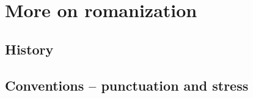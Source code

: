 







\section{More on romanization}
\subsection{History}
\subsection{Conventions -- punctuation and stress}
